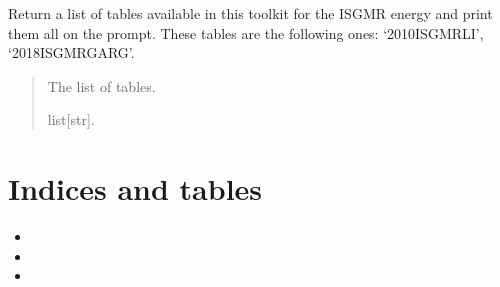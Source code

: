 \documentclass[letterpaper,10pt,english]{sphinxmanual}
\begin{document}
\begin{fulllineitems}
\label{\detokenize{source/api/setup_ISGMR:nucleardatapy.setup_ISGMR.tables_isgmr}}
\pysigstartsignatures
{}
\pysigstopsignatures
\sphinxAtStartPar
Return a list of tables available in this toolkit for the ISGMR energy and
print them all on the prompt. These tables are the following
ones: ‘2010\sphinxhyphen{}ISGMR\sphinxhyphen{}LI’, ‘2018\sphinxhyphen{}ISGMR\sphinxhyphen{}GARG’.
\begin{quote}\begin{description}
\sphinxAtStartPar
The list of tables.

\sphinxAtStartPar
list{[}str{]}.

\end{description}\end{quote}

\end{fulllineitems}



\chapter{Indices and tables}
\label{\detokenize{index:indices-and-tables}}\begin{itemize}
\item {} 
\sphinxAtStartPar
{}

\item {} 
\sphinxAtStartPar
{}

\item {} 
\sphinxAtStartPar
{}

\end{itemize}
\end{document}
